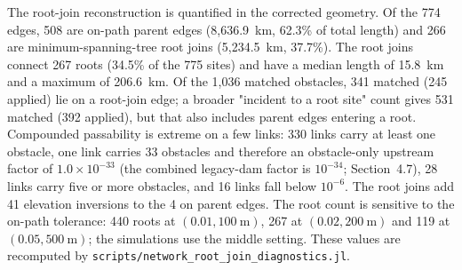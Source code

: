 \documentclass[11pt,a4paper]{article}
\begin{document}
The root-join reconstruction is quantified in the corrected geometry. Of the 774 edges, 508 are on-path parent edges (8{,}636.9~km, 62.3\% of total length) and 266 are minimum-spanning-tree root joins (5{,}234.5~km, 37.7\%). The root joins connect 267 roots (34.5\% of the 775 sites) and have a median length of 15.8~km and a maximum of 206.6~km. Of the 1{,}036 matched obstacles, 341 matched (245 applied) lie on a root-join edge; a broader "incident to a root site" count gives 531 matched (392 applied), but that also includes parent edges entering a root. Compounded passability is extreme on a few links: 330 links carry at least one obstacle, one link carries 33 obstacles and therefore an obstacle-only upstream factor of $1.0\times10^{-33}$ (the combined legacy-dam factor is $10^{-34}$; Section~4.7), 28 links carry five or more obstacles, and 16 links fall below $10^{-6}$. The root joins add 41 elevation inversions to the 4 on parent edges. The root count is sensitive to the on-path tolerance: 440 roots at $(0.01, 100~\mathrm{m})$, 267 at $(0.02, 200~\mathrm{m})$ and 119 at $(0.05, 500~\mathrm{m})$; the simulations use the middle setting. These values are recomputed by \texttt{scripts/network\_root\_join\_diagnostics.jl}.
\end{document}

